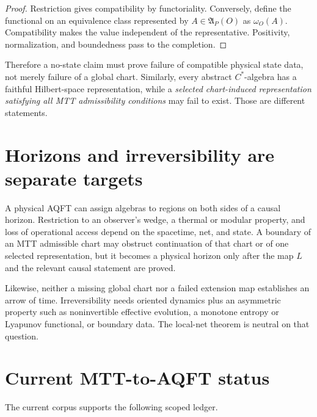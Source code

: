 \documentclass[11pt]{article}
\begin{document}
\begin{proof}
Restriction gives compatibility by functoriality.  Conversely, define the
functional on an equivalence class represented by $A\in\mathfrak A_P(O)$ as
$\omega_O(A)$.  Compatibility makes the value independent of the
representative.  Positivity, normalization, and boundedness pass to the
completion.
\end{proof}

Therefore a no-state claim must prove failure of compatible physical state
data, not merely failure of a global chart.  Similarly, every abstract
$C^*$-algebra has a faithful Hilbert-space representation, while a
\emph{selected chart-induced representation satisfying all MTT admissibility
conditions} may fail to exist.  Those are different statements.

\section{Horizons and irreversibility are separate targets}

A physical AQFT can assign algebras to regions on both sides of a causal
horizon.  Restriction to an observer's wedge, a thermal or modular property,
and loss of operational access depend on the spacetime, net, and state.  A
boundary of an MTT admissible chart may obstruct continuation of that chart or
of one selected representation, but it becomes a physical horizon only after
the map $L$ and the relevant causal statement are proved.

Likewise, neither a missing global chart nor a failed extension map establishes
an arrow of time.  Irreversibility needs oriented dynamics plus an asymmetric
property such as noninvertible effective evolution, a monotone entropy or
Lyapunov functional, or boundary data.  The local-net theorem is neutral on
that question.

\section{Current MTT-to-AQFT status}

The current corpus supports the following scoped ledger.
\end{document}
